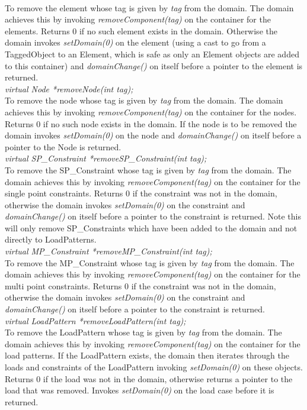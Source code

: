 \\
To remove the element whose tag is given by {\em tag} from the
domain. The domain achieves this by invoking {\em
removeComponent(tag)} on the container for the elements. 
Returns $0$ if no such element exists in the domain. Otherwise 
the domain invokes {\em setDomain(0)} on the element (using a cast to
go from a TaggedObject to an Element, which is safe as only an
Element objects are added to this container) and {\em
domainChange()} on itself before a pointer to the element is returned. \\

{\em virtual Node *removeNode(int tag);}\\    
To remove the node whose tag is given by {\em tag} from the domain. 
The domain achieves this by invoking {\em
removeComponent(tag)} on the container for the nodes. 
Returns $0$ if no such node exists in the domain. If the node is to be
removed the domain invokes {\em setDomain(0)} on the node and {\em
domainChange()} on itself before a pointer to the Node is returned.\\ 

{\em virtual SP\_Constraint *removeSP\_Constraint(int tag);}\\
To remove the SP\_Constraint whose tag is given by {\em tag} from the
domain. The domain achieves this by invoking {\em
removeComponent(tag)} on the container for the single point
constraints. Returns $0$ if the constraint was not in the domain,
otherwise the domain invokes {\em setDomain(0)} on the constraint and
{\em domainChange()} on itself before a pointer to the constraint is
returned. Note this will only remove SP\_Constraints which have been
added to the domain and not directly to LoadPatterns.\\

{\em virtual MP\_Constraint *removeMP\_Constraint(int tag);} \\
To remove the MP\_Constraint whose tag is given by {\em tag} from the
domain. The domain achieves this by invoking {\em
removeComponent(tag)} on the container for the multi point
constraints. Returns $0$ if the constraint was not in the domain,
otherwise the domain invokes {\em setDomain(0)} on the constraint and
{\em domainChange()} on itself before a pointer to the constraint is
returned.\\   

{\em virtual LoadPattern *removeLoadPattern(int tag);}\\         
To remove the LoadPattern whose tag is given by {\em tag} from the
domain. The domain achieves this by invoking {\em
removeComponent(tag)} on the container for the load patterns. 
If the LoadPattern exists, the domain then iterates through the loads
and constraints of the LoadPattern invoking {\em setDomain(0)} on
these objects. Returns
$0$ if the load was not in the domain, otherwise returns a pointer to
the load that was removed. Invokes {\em setDomain(0)} on the load case
before it is returned.\\ 


